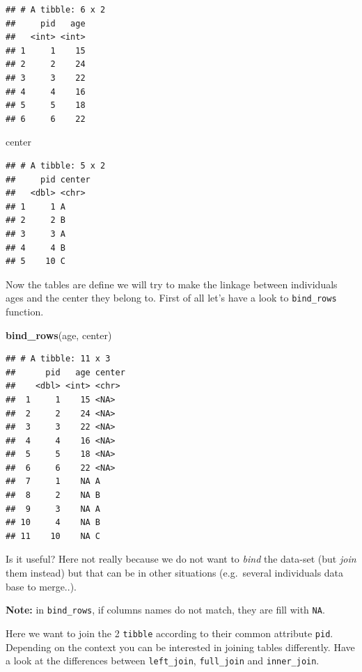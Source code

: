 \documentclass[
]{book}
\newenvironment{Shaded}{\begin{snugshade}}{\end{snugshade}}
\newcommand{\FunctionTok}[1]{\textcolor[rgb]{0.13,0.29,0.53}{\textbf{#1}}}
\newcommand{\NormalTok}[1]{#1}
\theoremstyle{definition}
\theoremstyle{definition}
\theoremstyle{definition}
\theoremstyle{definition}
\theoremstyle{remark}
\begin{document}
\begin{verbatim}
## # A tibble: 6 x 2
##     pid   age
##   <int> <int>
## 1     1    15
## 2     2    24
## 3     3    22
## 4     4    16
## 5     5    18
## 6     6    22
\end{verbatim}

\begin{Shaded}
\begin{Highlighting}[]
\NormalTok{center}
\end{Highlighting}
\end{Shaded}

\begin{verbatim}
## # A tibble: 5 x 2
##     pid center
##   <dbl> <chr> 
## 1     1 A     
## 2     2 B     
## 3     3 A     
## 4     4 B     
## 5    10 C
\end{verbatim}

Now the tables are define we will try to make the linkage between individuals ages and the center
they belong to.
First of all let's have a look to \texttt{bind\_rows} function.

\begin{Shaded}
\begin{Highlighting}[]
\FunctionTok{bind\_rows}\NormalTok{(age, center)}
\end{Highlighting}
\end{Shaded}

\begin{verbatim}
## # A tibble: 11 x 3
##      pid   age center
##    <dbl> <int> <chr> 
##  1     1    15 <NA>  
##  2     2    24 <NA>  
##  3     3    22 <NA>  
##  4     4    16 <NA>  
##  5     5    18 <NA>  
##  6     6    22 <NA>  
##  7     1    NA A     
##  8     2    NA B     
##  9     3    NA A     
## 10     4    NA B     
## 11    10    NA C
\end{verbatim}

Is it useful?
Here not really because we do not want to \emph{bind} the data-set (but \emph{join} them instead) but that can be in other situations (e.g.~several individuals data base to merge..).

\textbf{Note:} in \texttt{bind\_rows}, if columns names do not match, they are fill with \texttt{NA}.

Here we want to join the 2 \texttt{tibble} according to their common attribute \texttt{pid}. Depending
on the context you can be interested in joining tables differently. Have a look at the differences
between \texttt{left\_join}, \texttt{full\_join} and \texttt{inner\_join}.
\end{document}
